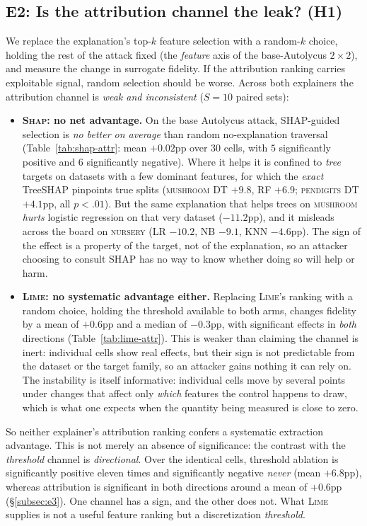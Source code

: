 \documentclass[sigconf,anonymous,review]{acmart}
\begin{document}
\subsection{E2: Is the attribution channel the leak? (H1)}
\label{subsec:e2}
We replace the explanation's top-$k$ feature selection with a random-$k$ choice, holding the rest of
the attack fixed (the \emph{feature} axis of the base-Autolycus $2{\times}2$), and measure the change
in surrogate fidelity. If the attribution ranking carries exploitable signal, random selection should
be worse. Across both explainers the attribution channel is \emph{weak and inconsistent} ($S{=}10$
paired sets):
\begin{itemize}
  \item \textbf{\textsc{Shap}: no net advantage.} On the base Autolycus attack, SHAP-guided selection
  is \emph{no better on average} than random no-explanation traversal (Table~\ref{tab:shap-attr}: mean $+0.02$pp over $30$ cells, with $5$ significantly positive and $6$ significantly negative). Where it
  helps it is confined to \emph{tree} targets on datasets with a few dominant features, for which the
  \emph{exact} TreeSHAP pinpoints true splits (\textsc{mushroom} DT $+9.8$, RF $+6.9$;
  \textsc{pendigits} DT $+4.1$pp, all $p{<}.01$). But the same explanation that helps trees on
  \textsc{mushroom} \emph{hurts} logistic regression on that very dataset ($-11.2$pp), and it misleads
  across the board on \textsc{nursery} (LR $-10.2$, NB $-9.1$, KNN $-4.6$pp). The sign of the effect is
  a property of the target, not of the explanation, so an attacker choosing to consult SHAP has no way
  to know whether doing so will help or harm.
  \item \textbf{\textsc{Lime}: no systematic advantage either.} Replacing \textsc{Lime}'s ranking with a random choice, holding the threshold available to both arms, changes fidelity by a mean of
  $+0.6$pp and a median of $-0.3$pp, with significant effects in \emph{both} directions
  (Table~\ref{tab:lime-attr}). This is weaker than claiming the channel is inert: individual cells
  show real effects, but their sign is not predictable from the dataset or the target family, so an
  attacker gains nothing it can rely on. The instability is itself informative: individual cells move
  by several points under changes that affect only \emph{which} features the control happens to draw,
  which is what one expects when the quantity being measured is close to zero.
\end{itemize}
So neither explainer's attribution ranking confers a systematic extraction advantage. This is not
merely an absence of significance: the contrast with the \emph{threshold} channel is \emph{directional}.
Over the identical cells, threshold ablation is significantly positive eleven times and significantly
negative \emph{never} (mean $+6.8$pp), whereas attribution is significant in both directions around a
mean of $+0.6$pp (\S\ref{subsec:e3}). One channel has a sign, and the other does not.
What \textsc{Lime} supplies is not a useful feature ranking but a discretization \emph{threshold}.
\end{document}
